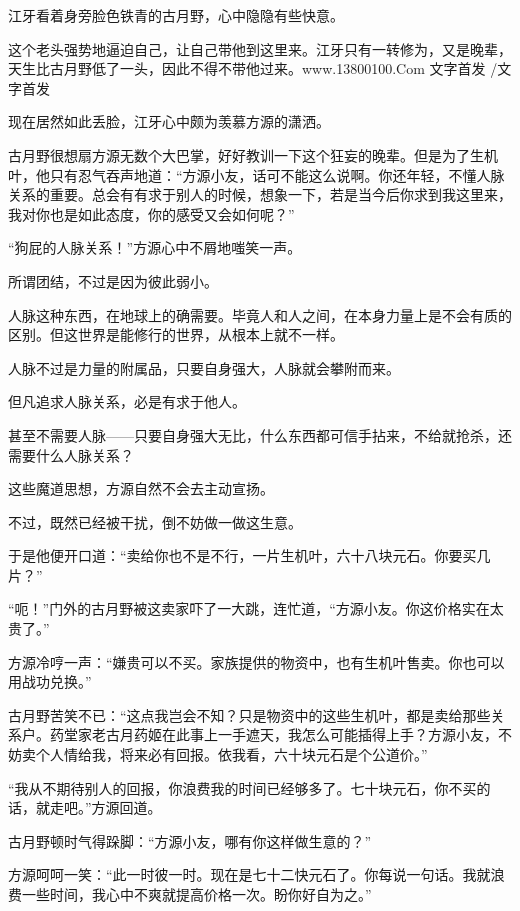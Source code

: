 
\begin{this_body}

江牙看着身旁脸色铁青的古月野，心中隐隐有些快意。

这个老头强势地逼迫自己，让自己带他到这里来。江牙只有一转修为，又是晚辈，天生比古月野低了一头，因此不得不带他过来。www.13800100.Com 文字首发 /文字首发

现在居然如此丢脸，江牙心中颇为羡慕方源的潇洒。

古月野很想扇方源无数个大巴掌，好好教训一下这个狂妄的晚辈。但是为了生机叶，他只有忍气吞声地道：“方源小友，话可不能这么说啊。你还年轻，不懂人脉关系的重要。总会有有求于别人的时候，想象一下，若是当今后你求到我这里来，我对你也是如此态度，你的感受又会如何呢？”

“狗屁的人脉关系！”方源心中不屑地嗤笑一声。

所谓团结，不过是因为彼此弱小。

人脉这种东西，在地球上的确需要。毕竟人和人之间，在本身力量上是不会有质的区别。但这世界是能修行的世界，从根本上就不一样。

人脉不过是力量的附属品，只要自身强大，人脉就会攀附而来。

但凡追求人脉关系，必是有求于他人。

甚至不需要人脉——只要自身强大无比，什么东西都可信手拈来，不给就抢杀，还需要什么人脉关系？

这些魔道思想，方源自然不会去主动宣扬。

不过，既然已经被干扰，倒不妨做一做这生意。

于是他便开口道：“卖给你也不是不行，一片生机叶，六十八块元石。你要买几片？”

“呃！”门外的古月野被这卖家吓了一大跳，连忙道，“方源小友。你这价格实在太贵了。”

方源冷哼一声：“嫌贵可以不买。家族提供的物资中，也有生机叶售卖。你也可以用战功兑换。”

古月野苦笑不已：“这点我岂会不知？只是物资中的这些生机叶，都是卖给那些关系户。药堂家老古月药姬在此事上一手遮天，我怎么可能插得上手？方源小友，不妨卖个人情给我，将来必有回报。依我看，六十块元石是个公道价。”

“我从不期待别人的回报，你浪费我的时间已经够多了。七十块元石，你不买的话，就走吧。”方源回道。

古月野顿时气得跺脚：“方源小友，哪有你这样做生意的？”

方源呵呵一笑：“此一时彼一时。现在是七十二快元石了。你每说一句话。我就浪费一些时间，我心中不爽就提高价格一次。盼你好自为之。”


\end{this_body}
